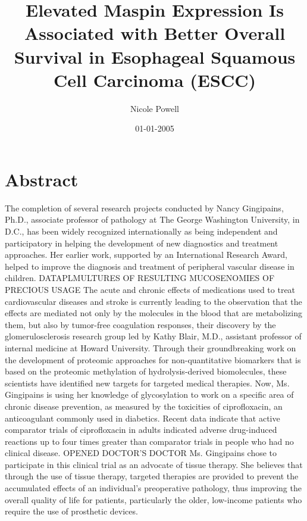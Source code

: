 \documentclass{article}%
\title{Elevated Maspin Expression Is Associated with Better Overall Survival in Esophageal Squamous Cell Carcinoma (ESCC)}%
\author{Nicole Powell}%
\affil{Department of Orthopedic Surgery, Xinhua Hospital, Shanghai Jiaotong University, School of Medicine, Shanghai 200092, P.R. China}%
\date{01{-}01{-}2005}%
\begin{document}
%
\normalsize%
\maketitle%
\section{Abstract}%
\label{sec:Abstract}%
The completion of several research projects conducted by Nancy Gingipains, Ph.D., associate professor of pathology at The George Washington University, in D.C., has been widely recognized internationally as being independent and participatory in helping the development of new diagnostics and treatment approaches. Her earlier work, supported by an International Research Award, helped to improve the diagnosis and treatment of peripheral vascular disease in children.\newline%
DATAPLMULTURES OF RESULTING MUCOSENOMIES OF PRECIOUS USAGE\newline%
The acute and chronic effects of medications used to treat cardiovascular diseases and stroke is currently leading to the observation that the effects are mediated not only by the molecules in the blood that are metabolizing them, but also by tumor{-}free coagulation responses, their discovery by the glomerulosclerosis research group led by Kathy Blair, M.D., assistant professor of internal medicine at Howard University. Through their groundbreaking work on the development of proteomic approaches for non{-}quantitative biomarkers that is based on the proteomic methylation of hydrolysis{-}derived biomolecules, these scientists have identified new targets for targeted medical therapies.\newline%
Now, Ms. Gingipains is using her knowledge of glycosylation to work on a specific area of chronic disease prevention, as measured by the toxicities of ciprofloxacin, an anticoagulant commonly used in diabetics. Recent data indicate that active comparator trials of ciprofloxacin in adults indicated adverse drug{-}induced reactions up to four times greater than comparator trials in people who had no clinical disease.\newline%
OPENED DOCTOR'S DOCTOR\newline%
Ms. Gingipains chose to participate in this clinical trial as an advocate of tissue therapy. She believes that through the use of tissue therapy, targeted therapies are provided to prevent the accumulated effects of an individual's preoperative pathology, thus improving the overall quality of life for patients, particularly the older, low{-}income patients who require the use of prosthetic devices.\newline%
\end{document}
